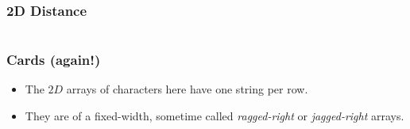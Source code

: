 
\begin{frame}[fragile]
\frametitle{2D Distance}

\begin{columns}
\begin{column}{0.60\textwidth}

\end{column}

\begin{column}{0.30\textwidth}
\end{column}

\end{columns}
\end{frame}



\begin{frame}[fragile]
\frametitle{Cards (again!)}



\pause
\begin{itemize}[<+->]
\item The $2D$ arrays of characters here have one string per row.
\item They are of a fixed-width, sometime called {\em ragged-right} or {\em jagged-right} arrays.
\end{itemize}

\end{frame}



